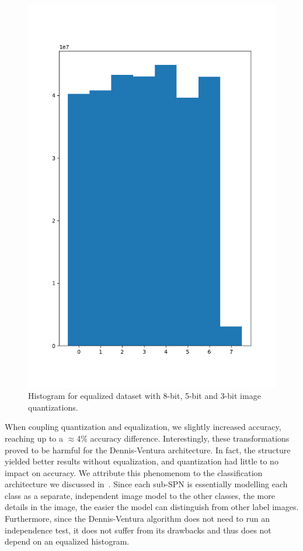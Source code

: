 \begin{figure}[h]
  \includegraphics[scale=0.3]{imgs/hist_3_eq.png}
  \caption{Histogram for equalized dataset with 8-bit, 5-bit and 3-bit image
  quantizations.\label{fig:hist-eq}}
\end{figure}

When coupling quantization and equalization, we slightly increased accuracy, reaching up to a
$\approx$4\% accuracy difference.  Interestingly, these transformations proved to be harmful for
the Dennis-Ventura architecture. In fact, the structure yielded better results without
equalization, and quantization had little to no impact on accuracy. We attribute this phenomenom to
the classification architecture we discussed in~. Since each sub-SPN is
essentially modelling each class as a separate, independent image model to the other classes, the
more details in the image, the easier the model can distinguish from other label images.
Furthermore, since the Dennis-Ventura algorithm does not need to run an independence test, it does
not suffer from its drawbacks and thus does not depend on an equalized histogram.
